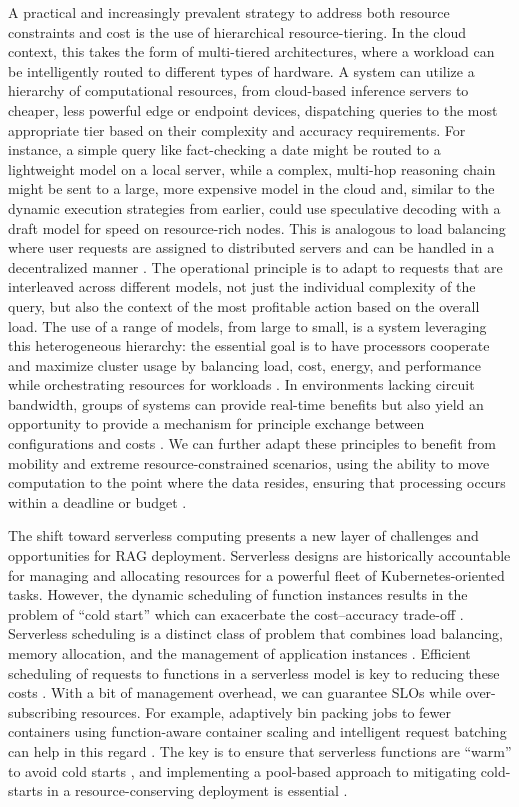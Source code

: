 \documentclass[11pt]{article}
\begin{document}
A practical and increasingly prevalent strategy to address both resource constraints and cost is the use of hierarchical resource-tiering. In the cloud context, this takes the form of multi-tiered architectures, where a workload can be intelligently routed to different types of hardware. A system can utilize a hierarchy of computational resources, from cloud-based inference servers to cheaper, less powerful edge or endpoint devices, dispatching queries to the most appropriate tier based on their complexity and accuracy requirements. For instance, a simple query like fact-checking a date might be routed to a lightweight model on a local server, while a complex, multi-hop reasoning chain might be sent to a large, more expensive model in the cloud and, similar to the dynamic execution strategies from earlier, could use speculative decoding with a draft model for speed on resource-rich nodes. This is analogous to load balancing where user requests are assigned to distributed servers and can be handled in a decentralized manner \cite{ref344}. The operational principle is to adapt to requests that are interleaved across different models, not just the individual complexity of the query, but also the context of the most profitable action based on the overall load. The use of a range of models, from large to small, is a system leveraging this heterogeneous hierarchy: the essential goal is to have processors cooperate and maximize cluster usage by balancing load, cost, energy, and performance while orchestrating resources for workloads \cite{ref345}. In environments lacking circuit bandwidth, groups of systems can provide real-time benefits but also yield an opportunity to provide a mechanism for principle exchange between configurations and costs \cite{ref339}. We can further adapt these principles to benefit from mobility and extreme resource-constrained scenarios, using the ability to move computation to the point where the data resides, ensuring that processing occurs within a deadline or budget \cite{ref346}.

The shift toward serverless computing presents a new layer of challenges and opportunities for RAG deployment. Serverless designs are historically accountable for managing and allocating resources for a powerful fleet of Kubernetes-oriented tasks. However, the dynamic scheduling of function instances results in the problem of ``cold start'' which can exacerbate the cost--accuracy trade-off \cite{ref347}. Serverless scheduling is a distinct class of problem that combines load balancing, memory allocation, and the management of application instances \cite{ref348}. Efficient scheduling of requests to functions in a serverless model is key to reducing these costs \cite{ref349}. With a bit of management overhead, we can guarantee SLOs while over-subscribing resources. For example, adaptively bin packing jobs to fewer containers using function-aware container scaling and intelligent request batching can help in this regard \cite{ref340}. The key is to ensure that serverless functions are ``warm'' to avoid cold starts \cite{ref347}, and implementing a pool-based approach to mitigating cold-starts in a resource-conserving deployment is essential \cite{ref347}.
\end{document}
